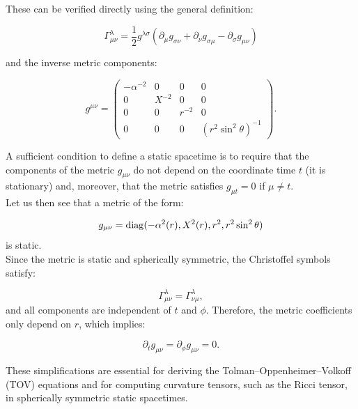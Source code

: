 \documentclass[12pt]{report}
\begin{document}
	These can be verified directly using the general definition:
	
	\begin{equation}
		\Gamma^\lambda_{\mu\nu} = \frac{1}{2} g^{\lambda\sigma}
		\left( \partial_\mu g_{\sigma\nu} + \partial_\nu g_{\sigma\mu} - \partial_\sigma g_{\mu\nu} \right)
	\end{equation}
	
	and the inverse metric components:
	
	\begin{equation}
		g^{\mu\nu} = 
		\begin{pmatrix}
			-\alpha^{-2} & 0 & 0 & 0 \\
			0 & X^{-2} & 0 & 0 \\
			0 & 0 & r^{-2} & 0 \\
			0 & 0 & 0 & (r^2 \sin^2\theta)^{-1}
		\end{pmatrix}.
	\end{equation}
	
	A sufficient condition to define a static spacetime is to require that the components of the metric $g_{\mu\nu}$ do not depend on the coordinate time $t$ (it is stationary) and, moreover, that the metric satisfies $g_{\mu t} = 0$ if $\mu\neq t$.\\
	
	Let us then see that a metric of the form:
	
	\begin{equation}
		g_{\mu\nu} = {\rm diag}(-\alpha^2(r), X^2(r), r^2, r^2\sin^2\theta)
	\end{equation}
	is static.\\
	
	Since the metric is static and spherically symmetric, the Christoffel symbols satisfy:
	
	\begin{equation}
		\Gamma^\lambda_{\mu\nu} = \Gamma^\lambda_{\nu\mu},
	\end{equation}
	and all components are independent of $t$ and $\phi$.  
	Therefore, the metric coefficients only depend on $r$, which implies:
	
	\begin{equation}
		\partial_t g_{\mu\nu} = \partial_\phi g_{\mu\nu} = 0.
	\end{equation}
	
	These simplifications are essential for deriving the Tolman–Oppenheimer–Volkoff (TOV) equations and for computing curvature tensors, such as the Ricci tensor, in spherically symmetric static spacetimes.\\
	
\end{document}
